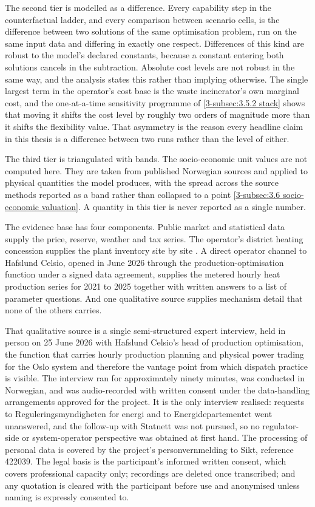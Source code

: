 The second tier is modelled as a difference. Every capability step in the counterfactual ladder, and every comparison between scenario cells, is the difference between two solutions of the same optimisation problem, run on the same input data and differing in exactly one respect. Differences of this kind are robust to the model's declared constants, because a constant entering both solutions cancels in the subtraction. Absolute cost levels are not robust in the same way, and the analysis states this rather than implying otherwise. The single largest term in the operator's cost base is the waste incinerator's own marginal cost, and the one-at-a-time sensitivity programme of \autoref{3-subsec:3.5.2 stack} shows that moving it shifts the cost level by roughly two orders of magnitude more than it shifts the flexibility value. That asymmetry is the reason every headline claim in this thesis is a difference between two runs rather than the level of either.

The third tier is triangulated with bands. The socio-economic unit values are not computed here. They are taken from published Norwegian sources and applied to physical quantities the model produces, with the spread across the source methods reported as a band rather than collapsed to a point \autoref{3-subsec:3.6 socio-economic valuation}. A quantity in this tier is never reported as a single number.

The evidence base has four components. Public market and statistical data supply the price, reserve, weather and tax series. The operator's district heating concession supplies the plant inventory site by site \cite{nve_konsesjonssak_2026}. A direct operator channel to Hafslund Celsio, opened in June 2026 through the production-optimisation function under a signed data agreement, supplies the metered hourly heat production series for 2021 to 2025 together with written answers to a list of parameter questions. And one qualitative source supplies mechanism detail that none of the others carries.

That qualitative source is a single semi-structured expert interview, held in person on 25 June 2026 with Hafslund Celsio's head of production optimisation, the function that carries hourly production planning and physical power trading for the Oslo system and therefore the vantage point from which dispatch practice is visible. The interview ran for approximately ninety minutes, was conducted in Norwegian, and was audio-recorded with written consent under the data-handling arrangements approved for the project. It is the only interview realised: requests to Reguleringsmyndigheten for energi and to Energidepartementet went unanswered, and the follow-up with Statnett was not pursued, so no regulator-side or system-operator perspective was obtained at first hand. The processing of personal data is covered by the project's personvernmelding to Sikt, reference 422039. The legal basis is the participant's informed written consent, which covers professional capacity only; recordings are deleted once transcribed; and any quotation is cleared with the participant before use and anonymised unless naming is expressly consented to.

